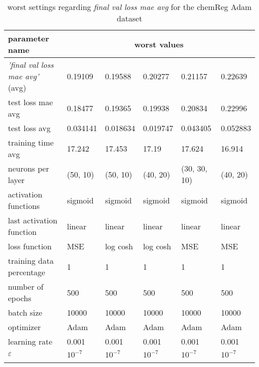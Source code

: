 \begin{longtable}{|l|l|l|l|l|>{\columncolor{worstColumnColor}}l|}
\hline
\textbf{parameter name} & \multicolumn{5}{c|}{\textbf{worst values}} \\
\hline
\textit{'final val loss mae avg'} (avg) & 0.19109 & 0.19588 & 0.20277 & 0.21157 & 0.22639 \\
test loss mae avg        & 0.18477 & 0.19365 & 0.19938 & 0.20834 & 0.22996 \\
test loss avg            & 0.034141 & 0.018634 & 0.019747 & 0.043405 & 0.052883 \\
training time avg        & 17.242  & 17.453  & 17.19   & 17.624  & 16.914  \\
neurons per layer        & (50, 10) & (50, 10) & (40, 20) & (30, 30, 10) & (40, 20) \\
{\color{equalParamColor} activation functions } & {\color{equalParamColor} sigmoid } & {\color{equalParamColor} sigmoid } & {\color{equalParamColor} sigmoid } & {\color{equalParamColor} sigmoid } & {\color{equalParamColor} sigmoid } \\
{\color{equalParamColor} last activation function } & {\color{equalParamColor} linear } & {\color{equalParamColor} linear } & {\color{equalParamColor} linear } & {\color{equalParamColor} linear } & {\color{equalParamColor} linear } \\
loss function            & MSE     & log cosh & log cosh & MSE     & MSE     \\
{\color{equalParamColor} training data percentage } & {\color{equalParamColor} 1 } & {\color{equalParamColor} 1 } & {\color{equalParamColor} 1 } & {\color{equalParamColor} 1 } & {\color{equalParamColor} 1 } \\
{\color{equalParamColor} number of epochs } & {\color{equalParamColor} 500 } & {\color{equalParamColor} 500 } & {\color{equalParamColor} 500 } & {\color{equalParamColor} 500 } & {\color{equalParamColor} 500 } \\
{\color{equalParamColor} batch size } & {\color{equalParamColor} 10000 } & {\color{equalParamColor} 10000 } & {\color{equalParamColor} 10000 } & {\color{equalParamColor} 10000 } & {\color{equalParamColor} 10000 } \\
{\color{equalParamColor} optimizer } & {\color{equalParamColor} Adam } & {\color{equalParamColor} Adam } & {\color{equalParamColor} Adam } & {\color{equalParamColor} Adam } & {\color{equalParamColor} Adam } \\
{\color{equalParamColor} learning rate } & {\color{equalParamColor} 0.001 } & {\color{equalParamColor} 0.001 } & {\color{equalParamColor} 0.001 } & {\color{equalParamColor} 0.001 } & {\color{equalParamColor} 0.001 } \\
{\color{equalParamColor} $\varepsilon$ } & {\color{equalParamColor} $10^{-7}$ } & {\color{equalParamColor} $10^{-7}$ } & {\color{equalParamColor} $10^{-7}$ } & {\color{equalParamColor} $10^{-7}$ } & {\color{equalParamColor} $10^{-7}$ } \\
\hline

\caption{worst settings regarding \textit{final val loss mae avg} for the chemReg Adam dataset}
\label{table:final_val_loss_mae_avg_worst_chemreg_adam}
\end{longtable}
